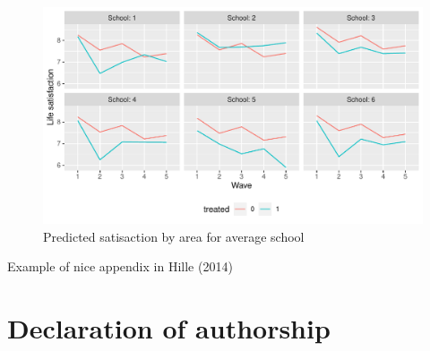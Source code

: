 \documentclass[a4, 12pt]{article}
\begin{document}
\begin{figure}[H]

{\centering \includegraphics[width=0.8\linewidth,]{../figures/sat_school_pred_across_schools} 

}

\caption{Predicted satisaction by area for average school}\label{fig:sat-school-pred-across-schools}
\end{figure}

Example of nice appendix in Hille (2014)

\hypertarget{declaration-of-authorship}{%
\section{Declaration of authorship}\label{declaration-of-authorship}}
\end{document}
